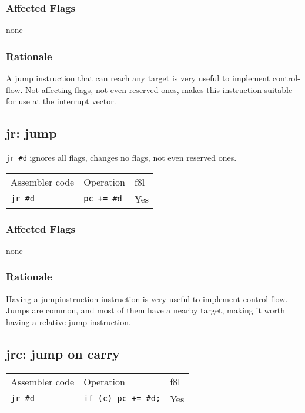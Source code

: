 \documentclass{book}
\begin{document}
\subsubsection*{Affected Flags}

none

\subsubsection*{Rationale}

A jump instruction that can reach any target is very useful to implement control-flow. Not affecting flags, not even reserved ones, makes this instruction suitable for use at the interrupt vector.


\subsection{jr: jump}

\texttt{jr \#d} ignores all flags, changes no flags, not even reserved ones.

\begin{tabular}{l l l}
Assembler code  & Operation          & f8l \\
\texttt{jr \#d} & \texttt{pc += \#d} & Yes \\
\end{tabular}

\subsubsection*{Affected Flags}

none

\subsubsection*{Rationale}

Having a jumpinstruction instruction is very useful to implement control-flow. Jumps are common, and most of them have a nearby target, making it worth having a relative jump instruction.


\subsection{jrc: jump on carry}

\begin{tabular}{l l l}
Assembler code  & Operation                  & f8l \\
\texttt{jr \#d} & \texttt{if (c) pc += \#d;} & Yes \\
\end{tabular}
\end{document}
